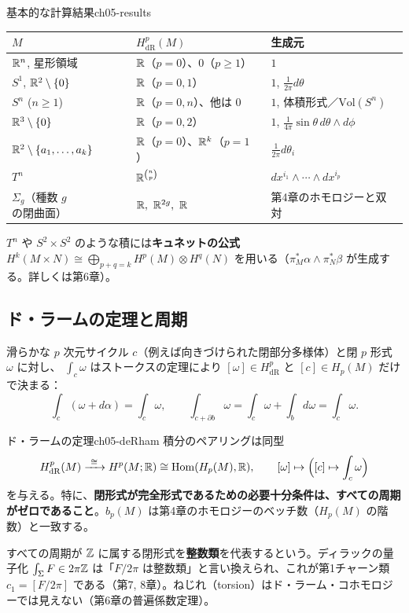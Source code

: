 \begin{myex}{基本的な計算結果}{ch05-results}
\begin{center}
\renewcommand{\arraystretch}{1.25}\small
\begin{tabular}{lll}
$M$ & $H^p_{\mathrm{dR}}(M)$ & 生成元\\ \hline
$\mathbb{R}^n$, 星形領域 & $\mathbb{R}$（$p=0$）、$0$（$p\ge1$） & $1$\\
$S^1$, $\mathbb{R}^2\setminus\{0\}$ & $\mathbb{R}$（$p=0,1$） & $1$, $\frac{1}{2\pi}d\theta$\\
$S^n$ ($n\ge1$) & $\mathbb{R}$（$p=0,n$）、他は $0$ & $1$, 体積形式／$\mathrm{Vol}(S^n)$\\
$\mathbb{R}^3\setminus\{0\}$ & $\mathbb{R}$（$p=0,2$） & $1$, $\frac{1}{4\pi}\sin\theta\,d\theta\wedge d\phi$\\
$\mathbb{R}^2\setminus\{a_1,\dots,a_k\}$ & $\mathbb{R}$（$p=0$）、$\mathbb{R}^k$（$p=1$） & $\frac1{2\pi}d\theta_i$\\
$T^n$ & $\mathbb{R}^{\binom np}$ & $dx^{i_1}\wedge\cdots\wedge dx^{i_p}$\\
$\Sigma_g$（種数 $g$ の閉曲面） & $\R,\ \R^{2g},\ \R$ & 第4章のホモロジーと双対
\end{tabular}
\end{center}
$T^n$ や $S^2\times S^2$ のような積には\textbf{キュネットの公式} $H^k(M\times N)\cong\bigoplus_{p+q=k}H^p(M)\otimes H^q(N)$ を用いる（$\pi_M^*\alpha\wedge\pi_N^*\beta$ が生成する。詳しくは第6章）。
\end{myex}

\subsection{ド・ラームの定理と周期}
滑らかな $p$ 次元サイクル $c$（例えば向きづけられた閉部分多様体）と閉 $p$ 形式 $\omega$ に対し、 $\int_c\omega$ はストークスの定理により $[\omega]\in H^p_{\mathrm{dR}}$ と $[c]\in H_p(M)$ だけで決まる：
\[
\int_c(\omega+d\alpha)=\int_c\omega,\qquad \int_{c+\partial b}\omega=\int_c\omega+\int_bd\omega=\int_c\omega .
\]
\begin{mythm}{ド・ラームの定理}{ch05-deRham}
積分のペアリングは同型
\[
H^p_{\mathrm{dR}}(M)\xrightarrow{\ \cong\ }H^p(M;\R)\cong\Hom(H_p(M),\R),\qquad[\omega]\mapsto\Bigl([c]\mapsto\int_c\omega\Bigr)
\]
を与える。特に、\textbf{閉形式が完全形式であるための必要十分条件は、すべての周期がゼロであること}。$b_p(M)$ は第4章のホモロジーのベッチ数（$H_p(M)$ の階数）と一致する。
\end{mythm}
すべての周期が $\mathbb{Z}$ に属する閉形式を\textbf{整数類}を代表するという。ディラックの量子化 $\int_\Sigma F\in2\pi\mathbb{Z}$ は「$F/2\pi$ は整数類」と言い換えられ、これが第1チャーン類 $c_1=[F/2\pi]$ である（第7, 8章）。ねじれ（torsion）はド・ラーム・コホモロジーでは見えない（第6章の普遍係数定理）。

